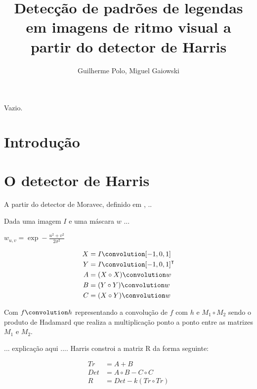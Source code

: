 \documentclass[12pt]{article}
\title{Detecção de padrões de legendas em imagens de ritmo visual a partir
do detector de Harris}
\author{Guilherme Polo\inst{1}, Miguel Gaiowski\inst{1}}
\begin{document}
\maketitle

\begin{resumo}
  Vazio.
\end{resumo}


\section{Introdução}

\cite{harris}


\section{O detector de Harris}

A partir do detector de Moravec, definido em \cite{moravec}, ..


Dada uma imagem $I$ e uma máscara $w$ ...

$w_{u,v} = \exp -\frac{u^2 + v^2}{2\sigma^2}$


\begin{align*}
  X & = I \convolution [-1, 0, 1] \\
  Y & = I \convolution [-1, 0, 1]^\intercal \\
  A & = (X \circ X) \convolution w \\
  B & = (Y \circ Y) \convolution w \\
  C & = (X \circ Y) \convolution w
\end{align*}

Com $f \convolution h$ representando a convolução de $f$ com $h$ e
$M_1 \circ M_2$ sendo o produto de Hadamard que realiza a
multiplicação ponto a ponto entre as matrizes $M_1$ e $M_2$.

... explicação aqui .... Harris constroi a matriz R da forma seguinte:

\begin{align}
  Tr & = A + B \nonumber \\
  Det & = A \circ B - C \circ C \nonumber \\
  R & = Det - k (Tr \circ Tr) \label{REq}
\end{align}
\end{document}
